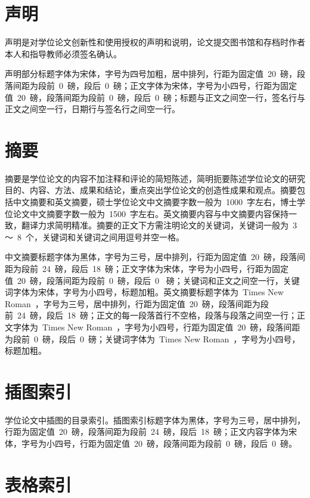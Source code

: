 \section{声明}

声明是对学位论文创新性和使用授权的声明和说明，论文提交图书馆和存档时作者本人和指导教师必须签名确认。

声明部分标题字体为宋体，字号为四号加粗，居中排列，行距为固定值~20~磅，段落间距为段前~0~磅，段后~0~磅；正文字体为宋体，字号为小四号，行距为固定值~20~磅，段落间距为段前~0~磅，段后~0~磅；标题与正文之间空一行，签名行与正文之间空一行，日期行与签名行之间空一行。

\section{摘要}

摘要是学位论文的内容不加注释和评论的简短陈述，简明扼要陈述学位论文的研究目的、内容、方法、成果和结论，重点突出学位论文的创造性成果和观点。摘要包括中文摘要和英文摘要，硕士学位论文中文摘要字数一般为~1000~字左右，博士学位论文中文摘要字数一般为~1500~字左右。英文摘要内容与中文摘要内容保持一致，翻译力求简明精准。摘要的正文下方需注明论文的关键词，关键词一般为~3~ ～~8~个，关键词和关键词之间用逗号并空一格。

中文摘要标题字体为黑体，字号为三号，居中排列，行距为固定值~20~磅，段落间距为段前~24~磅，段后~18~磅；正文字体为宋体，字号为小四号，行距为固定值~20~磅，段落间距为段前~0~磅，段后~0~ 磅；关键词和正文之间空一行，关键词字体为宋体，字号为小四号，标题加粗。英文摘要标题字体为~Times New Roman~，字号为三号，居中排列，行距为固定值~20~磅，段落间距为段前~24~磅，段后~18~磅；正文的每一段落首行不空格，段落与段落之间空一行；正文字体为~Times New Roman~，字号为小四号，行距为固定值~20~磅，段落间距为段前~0~磅，段后~0~磅；关键词字体为~Times New Roman~，字号为小四号，标题加粗。

\section{插图索引}

学位论文中插图的目录索引。插图索引标题字体为黑体，字号为三号，居中排列，行距为固定值~20~磅，段落间距为段前~24~磅，段后~18~磅；正文内容字体为宋体，字号为小四号，行距为固定值~20~磅，段落间距为段前~0~磅，段后~0~磅。

\section{表格索引}

